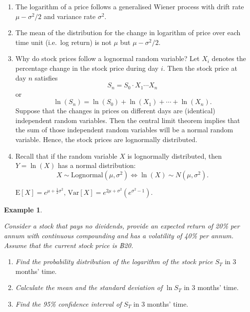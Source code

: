 \documentclass[
]{book}
\theoremstyle{definition}
\theoremstyle{definition}
\newtheorem{example}{Example}[chapter]
\theoremstyle{definition}
\theoremstyle{definition}
\theoremstyle{remark}
\begin{document}
\begin{enumerate}
\def\labelenumi{\arabic{enumi}.}
\item
  The logarithm of a price follows a generalised Wiener process with
  drift rate \(\mu - \sigma^2/2\) and variance rate \(\sigma^2\).
\item
  The mean of the distribution for the change in logarithm of price
  over each time unit (i.e.~log return) is not \(\mu\) but
  \(\mu - \sigma^2/2\).
\item
  Why do stock prices follow a lognormal random variable? Let \(X_i\)
  denotes the percentage change in the stock price during day \(i\).
  Then the stock price at day \(n\) satisfies
  \[S_n = S_0 \cdot X_1 \cdots X_n\] or
  \[\ln(S_n) = \ln(S_0) + \ln(X_1) + \cdots + \ln(X_n).\] Suppose that
  the changes in prices on different days are (identical) independent
  random variables. Then the central limit theorem implies that the
  sum of those independent random variables will be a normal random
  variable. Hence, the stock prices are lognormally distributed.
\item
  Recall that if the random variable \(X\) is lognormally distributed,
  then \(Y = \ln(X)\) has a normal distribution:
  \[X \sim \text{Lognormal}(\mu,\sigma^2)  \Longleftrightarrow \ln(X) \sim N(\mu,\sigma^2).\]

  \(\mathrm{E}[X] = e^{\mu + \frac{1}{2}\sigma^2}, \, \mathrm{Var}[X] = e^{2\mu + \sigma^2}\left( e^{\sigma^2 - 1} \right).\)
\end{enumerate}

\begin{example}
\protect\hypertarget{exm:unlabeled-div-80}{}\label{exm:unlabeled-div-80}

\emph{Consider a stock that pays no dividends, provide an expected return of
20\% per annum with continuous compounding and has a volatility of 40\%
per annum. Assume that the current stock price is ฿20.}

\begin{enumerate}
\def\labelenumi{\arabic{enumi}.}
\item
  \emph{Find the probability distribution of the logarithm of the stock
  price} \(S_T\) in 3 months' time.
\item
  \emph{Calculate the mean and the standard deviation of} \(\ln S_T\) in 3
  months' time.
\item
  \emph{Find the 95\% confidence interval of} \(S_T\) in 3 months' time.
\end{enumerate}

\end{example}
\end{document}

